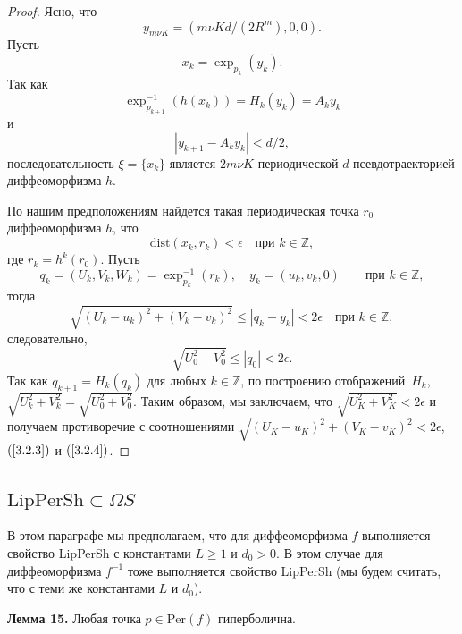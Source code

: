 \documentclass[12pt]{article}
\begin{document}
\begin{proof}
Ясно, что
\begin{equation}
\label{3.2.4}
y_{m\nu K}=(m\nu Kd/(2R^m),0,0).
\end{equation}
Пусть
$$x_k=\exp_{p_k}(y_k).$$
Так как 
$$\exp_{p_{k+1}}^{-1}(h(x_k))=H_k(y_k)=A_ky_k$$
и
$$|y_{k+1}-A_ky_k|< d/2,$$
последовательность $\xi=\{x_k\}$ является $2m\nu K$-периодической $d$-псевдотраекторией диффеоморфизма $h$.

По нашим предположениям найдется такая периодическая точка $r_0$ диффеоморфизма $h$, что 
$$\mbox{dist}(x_k,r_k)<\epsilon\quad\mbox{при }k\in\mathbb{Z},$$
где $r_k=h^k(r_0)$. Пусть
$$q_k=(U_k,V_k,W_k)=\exp^{-1}_{p_k}(r_k),\quad y_k=(u_k,v_k,0)\qquad\mbox{при }k\in\mathbb{Z},$$
тогда
$$\sqrt{(U_k-u_k)^2 + (V_k-v_k)^2}\leq |q_k-y_k|<2\epsilon\quad\mbox{при }k\in\mathbb{Z},$$
следовательно, 
$$\sqrt{U_0^2+V_0^2}\leq |q_0|< 2\epsilon.$$
Так как $q_{k+1}=H_k(q_k)$ для любых $k\in\mathbb{Z}$, по построению отображений~$H_k$, $\sqrt{U_k^2+V_k^2}=\sqrt{U_0^2+V_0^2}$. Таким образом, мы заключаем, что $\sqrt{U_K^2+V^2_K}<2\epsilon$ и получаем противоречие с соотношениями $\sqrt{(U_K-u_K)^2+(V_K-v_K)^2}<2\epsilon$, $(\ref{3.2.3})$ и $(\ref{3.2.4})$.
\end{proof}

\subsection{$\mbox{LipPerSh}\subset\Omega S$}

В этом параграфе мы предполагаем, что для диффеоморфизма $f$ выполняется свойство LipPerSh с константами $L\geq 1$ и $d_0>0$. В этом случае для диффеоморфизма $f^{-1}$ тоже выполняется свойство LipPerSh (мы будем считать, что с теми же константами $L$ и $d_0$).

\textbf{Лемма 15.} Любая точка $p\in\mbox{Per}(f)$ гиперболична.
\end{document}

